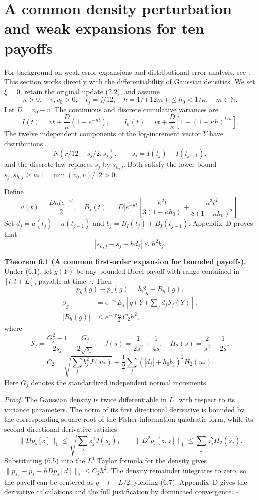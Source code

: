 \documentclass[11pt,a4paper]{article}
\begin{document}
\section{A common density perturbation and weak expansions for ten payoffs}

For background on weak error expansions and distributional error analysis, see
\cite{TalayTubaro1990,MickelNeuenkirch2023,BallyTalay1996}.
This section works directly with the differentiability of Gaussian densities.
We set \(\xi=0\), retain the original update (2.2), and assume
\[
\kappa>0,\quad \bar v,v_0>0,\quad
t_j=j/12,\quad h=1/(12m)\le h_0<1/\kappa,\quad m\in\mathbb N.
\tag{6.1}
\]
Let \(D=v_0-\bar v\). The continuous and discrete cumulative variances are
\[
I(t)=\bar vt+\frac D\kappa(1-e^{-\kappa t}),\qquad
I_h(t)=\bar vt+\frac D\kappa[1-(1-\kappa h)^{t/h}].
\tag{6.2}
\]
The twelve independent components of the log-increment vector \(Y\) have distributions
\[
N(r/12-s_j/2,s_j),\qquad s_j=I(t_j)-I(t_{j-1}),
\tag{6.3}
\]
and the discrete law replaces \(s_j\) by \(s_{h,j}\).
Both satisfy the lower bound
\(s_j,s_{h,j}\ge u_*:=\min(v_0,\bar v)/12>0\).

Define
\[
a(t)=\frac{D\kappa t e^{-\kappa t}}2,
\quad
B_I(t)=|D|e^{-\kappa t}
\left[
\frac{\kappa^2t}{3(1-\kappa h_0)}
+\frac{\kappa^3t^2}{8(1-\kappa h_0)^2}
\right].
\tag{6.4}
\]
Set \(d_j=a(t_j)-a(t_{j-1})\) and
\(b_j=B_I(t_j)+B_I(t_{j-1})\). Appendix~D proves that
\[
|s_{h,j}-s_j-hd_j|\le h^2b_j.
\tag{6.5}
\]

\textbf{Theorem 6.1 (A common first-order expansion for bounded payoffs).}
Under (6.1), let \(g(Y)\) be any bounded Borel payoff with range contained in
\([l,l+L]\), payable at time \(\tau\). Then
\[
p_h(g)-p_c(g)=h\beta_g+R_h(g),
\tag{6.6}
\]
\[
\begin{aligned}
\beta_g&=e^{-r\tau}E_s\!\left[g(Y)\sum_jd_j\mathcal S_j(Y)\right],\\
|R_h(g)|&\le e^{-r\tau}\frac L2\,C_2h^2,
\end{aligned}
\tag{6.7}
\]
where
\[
\mathcal S_j=\frac{G_j^2-1}{2s_j}-\frac{G_j}{2\sqrt{s_j}},
\quad
J(s)=\frac1{2s^2}+\frac1{4s},\quad
H_2(s)=\frac2{s^2}+\frac1{2s},
\]
\[
C_2=
\sqrt{\sum_jb_j^2J(u_*)}
+\frac12\sum_j(|d_j|+h_0b_j)^2H_2(u_*).
\tag{6.8}
\]
Here \(G_j\) denotes the standardized independent normal increments.

\textit{Proof.}
The Gaussian density is twice differentiable in \(L^1\) with respect to its variance parameters.
The norm of its first directional derivative is bounded by the corresponding
square root of the Fisher information quadratic form, while its second directional derivative satisfies
\[
\|Dp_s[z]\|_1\le\sqrt{\sum_jz_j^2J(s_j)},\qquad
\|D^2p_s[z,z]\|_1\le\sum_jz_j^2H_2(s_j).
\]
Substituting (6.5) into the \(L^1\) Taylor formula for the density gives
\(\|p_{s_h}-p_s-hDp_s[d]\|_1\le C_2h^2\).
The density remainder integrates to zero, so the payoff can be centered as
\(g-l-L/2\), yielding (6.7).
Appendix~D gives the derivative calculations and the full justification by dominated convergence.
\hfill\(\square\)
\end{document}
